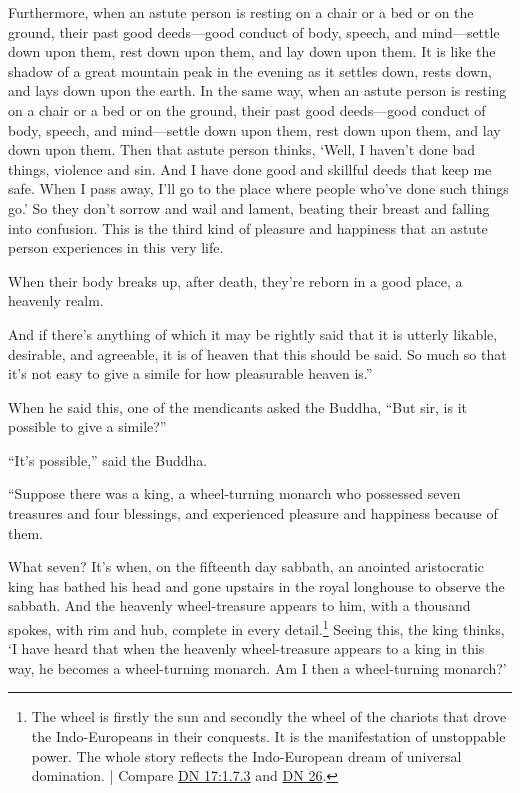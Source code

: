\documentclass[12pt,openany]{book}%
\begin{document}
Furthermore, when an astute person is resting on a chair or a bed or on the ground, their past good deeds—good conduct of body, speech, and mind—settle down upon them, rest down upon them, and lay down upon them. It is like the shadow of a great mountain peak in the evening as it settles down, rests down, and lays down upon the earth. In the same way, when an astute person is resting on a chair or a bed or on the ground, their past good deeds—good conduct of body, speech, and mind—settle down upon them, rest down upon them, and lay down upon them. Then that astute person thinks, ‘Well, I haven’t done bad things, violence and sin. And I have done good and skillful deeds that keep me safe. When I pass away, I’ll go to the place where people who’ve done such things go.’ So they don’t sorrow and wail and lament, beating their breast and falling into confusion. This is the third kind of pleasure and happiness that an astute person experiences in this very life. 

When their body breaks up, after death, they’re reborn in a good place, a heavenly realm. 

And if there’s anything of which it may be rightly said that it is utterly likable, desirable, and agreeable, it is of heaven that this should be said. So much so that it’s not easy to give a simile for how pleasurable heaven is.” 

When he said this, one of the mendicants asked the Buddha, “But sir, is it possible to give a simile?” 

“It’s possible,” said the Buddha. 

“Suppose there was a king, a wheel-turning monarch who possessed seven treasures and four blessings, and experienced pleasure and happiness because of them. 

What seven? It’s when, on the fifteenth day sabbath, an anointed aristocratic king has bathed his head and gone upstairs in the royal longhouse to observe the sabbath. And the heavenly wheel-treasure appears to him, with a thousand spokes, with rim and hub, complete in every detail.\footnote{The wheel is firstly the sun and secondly the wheel of the chariots that drove the Indo-Europeans in their conquests. It is the manifestation of unstoppable power. The whole story reflects the Indo-European dream of universal domination. | Compare \href{https://suttacentral.net/dn17/en/sujato\#1.7.3}{DN 17:1.7.3} and \href{https://suttacentral.net/dn26/en/sujato}{DN 26}. } Seeing this, the king thinks, ‘I have heard that when the heavenly wheel-treasure appears to a king in this way, he becomes a wheel-turning monarch. Am I then a wheel-turning monarch?’ 
\end{document}
